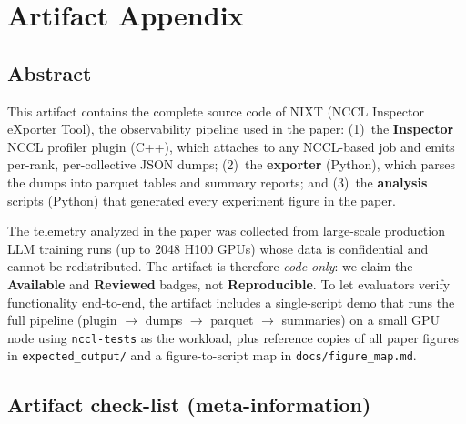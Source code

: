 \documentclass[10pt,twocolumn]{article}
\begin{document}
\appendix
\section{Artifact Appendix}

\subsection{Abstract}

This artifact contains the complete source code of NIXT (NCCL
Inspector eXporter Tool), the observability pipeline used in the
paper: (1)~the \textbf{Inspector} NCCL profiler plugin (C++), which
attaches to any NCCL-based job and emits per-rank, per-collective
JSON dumps; (2)~the \textbf{exporter} (Python), which parses the
dumps into parquet tables and summary reports; and (3)~the
\textbf{analysis} scripts (Python) that generated every experiment
figure in the paper.

The telemetry analyzed in the paper was collected from large-scale
production LLM training runs (up to 2048 H100 GPUs) whose data is
confidential and cannot be redistributed. The artifact is therefore
\emph{code only}: we claim the \textbf{Available} and
\textbf{Reviewed} badges, not \textbf{Reproducible}. To let
evaluators verify functionality end-to-end, the artifact includes a
single-script demo that runs the full pipeline (plugin
$\rightarrow$ dumps $\rightarrow$ parquet $\rightarrow$ summaries)
on a small GPU node using \texttt{nccl-tests} as the workload, plus
reference copies of all paper figures in \texttt{expected\_output/}
and a figure-to-script map in \texttt{docs/figure\_map.md}.

\subsection{Artifact check-list (meta-information)}
\end{document}
